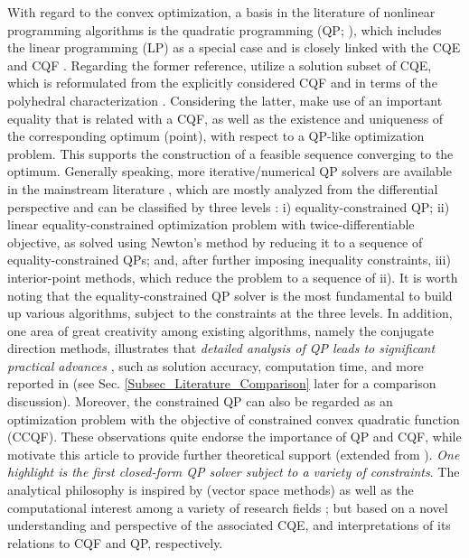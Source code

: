 \documentclass{imaman}
\numberwithin{equation}{section}
\begin{document}
With regard to the convex optimization, a basis in the literature of nonlinear programming algorithms is the quadratic programming (QP; \cite{LiTsWo:20,Lu(Ye):03(16)}), which includes the linear programming (LP) as a special case and is closely linked with the CQE and CQF \citep{PaSa:10,RaBoJoVeJo:08}. Regarding the former reference, \cite{PaSa:10} utilize a solution subset of CQE, which is reformulated from the explicitly considered CQF and in terms of the polyhedral characterization \citep{Man:88}. Considering the latter, \cite{RaBoJoVeJo:08} make use of an important equality that is related with a CQF, as well as the existence and uniqueness of the corresponding optimum (point), with respect to a QP-like optimization problem. This supports the construction of a feasible sequence converging to the optimum. Generally speaking, more iterative/numerical QP solvers are available in the mainstream literature \citep{NoWr:06}, which are mostly analyzed from the differential perspective and can be classified by three levels \citep{BoVa:04}: i) equality-constrained QP; ii) linear equality-constrained optimization problem with twice-differentiable objective, as solved using Newton's method by reducing it to a sequence of equality-constrained QPs; and, after further imposing inequality constraints, iii) interior-point methods, which reduce the problem to a sequence of ii). It is worth noting that the equality-constrained QP solver is the most fundamental to build up various algorithms, subject to the constraints at the three levels. In addition, one area of great creativity among existing algorithms, namely the conjugate direction methods, illustrates that \textit{detailed analysis of QP leads to significant practical advances} \citep{Lu(Ye):03(16)}, such as solution accuracy, computation time, and more reported in \cite{JoFoTo:05} (see Sec. \ref{Subsec_Literature_Comparison} later for a comparison discussion). Moreover, the constrained QP can also be regarded as an optimization problem with the objective of constrained convex quadratic function (CCQF). These observations quite endorse the importance of QP and CQF, while motivate this article to provide further theoretical support (extended from \cite{LiLiHs:20}). \textit{One highlight is the first closed-form QP solver subject to a variety of constraints}. The analytical philosophy is inspired by \cite{Lue:69} (vector space methods) as well as the computational interest among a variety of research fields \citep{DuJoWaWi:15,JoFo:13,Lu(Ye):03(16),RaLe:19}; but based on a novel understanding and perspective of the associated CQE, and interpretations of its relations to CQF and QP, respectively.
\end{document}

